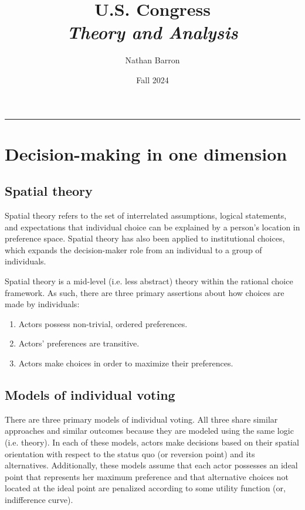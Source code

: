 \documentclass[10pt]{article}
\title{\textbf{U.S. Congress}\\\textit{Theory and Analysis}}
\author{Nathan Barron}
\date{Fall 2024}
\begin{document}
	\maketitle
	\tableofcontents
	\vspace{.25in}
	\hrule
	\vspace{.25in}
	
	\section{Decision-making in one dimension}
	
	\subsection{Spatial theory}
	
	Spatial theory refers to the set of interrelated assumptions, logical statements, and expectations that individual choice can be explained by a person's location in preference space. Spatial theory has also been applied to institutional choices, which expands the decision-maker role from an individual to a group of individuals. 
	
	Spatial theory is a mid-level (i.e. less abstract) theory within the rational choice framework. As such, there are three primary assertions about how choices are made by individuals: 
	
	\begin{enumerate}
		\item Actors possess non-trivial, ordered preferences. 
		\item Actors' preferences are transitive. 
		\item Actors make choices in order to maximize their preferences. 
	\end{enumerate}
	
	\subsection{Models of individual voting}
	
	There are three primary models of individual voting. All three share similar approaches and similar outcomes because they are modeled using the same logic (i.e. theory). In each of these models, actors make decisions based on their spatial orientation with respect to the status quo (or reversion point) and its alternatives. Additionally, these models assume that each actor possesses an ideal point that represents her maximum preference and that alternative choices not located at the ideal point are penalized according to some utility function (or, indifference curve). 
	
\end{document}
